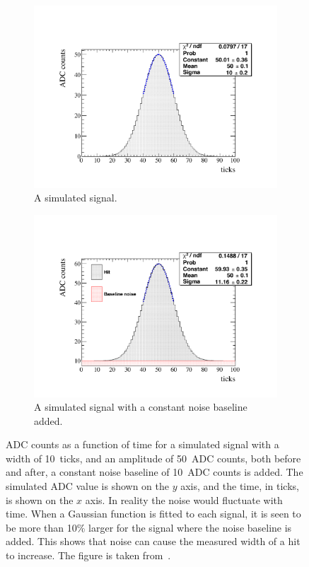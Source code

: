 \begin{figure}
  \centering
  \begin{subfigure}{0.48\textwidth}
    \centering
    \includegraphics[width=\textwidth]{ToyGauss_Raw}
    \caption{A simulated signal.}
  \end{subfigure}%
  \hspace{0.03\textwidth}%
  \begin{subfigure}{0.48\textwidth}
    \centering
    \includegraphics[width=\textwidth]{ToyGauss_Noise}
    \caption{A simulated signal with a constant noise baseline added.}
  \end{subfigure}
  \caption[The effect of adding a noise baseline to a hit]
          {ADC counts as a function of time for a simulated signal with a width of 10~ticks, and an amplitude of 50~ADC counts, both before and after, a constant noise baseline of 10~ADC counts is added. The simulated ADC value is shown on the $y$ axis, and the time, in ticks, is shown on the $x$ axis. In reality the noise would fluctuate with time. When a Gaussian function is fitted to each signal, it is seen to be more than 10\% larger for the signal where the noise baseline is added. This shows that noise can cause the measured width of a hit to increase. The figure is taken from~\citep{DomSeptMeeting}.}
          \label{fig:DomsHitModel}
\end{figure}  

